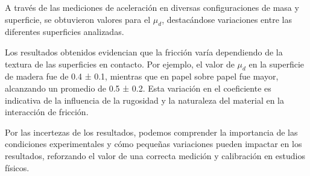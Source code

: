 \documentclass[12pt,a4]{article}
\begin{document}
A través de las mediciones de aceleración en diversas configuraciones de masa y superficie, se obtuvieron valores para el $\mu_d$, destacándose variaciones entre las diferentes superficies analizadas.

Los resultados obtenidos evidencian que la fricción varía dependiendo de la textura de las superficies en contacto. Por ejemplo, el valor de $\mu_d$ en la superficie de madera fue de 0.4 ± 0.1, mientras que en papel sobre papel fue mayor, alcanzando un promedio de 0.5 ± 0.2. Esta variación en el coeficiente es indicativa de la influencia de la rugosidad y la naturaleza del material en la interacción de fricción.

Por las incertezas de los resultados, podemos comprender la importancia de las condiciones experimentales y cómo pequeñas variaciones pueden impactar en los resultados, reforzando el valor de una correcta medición y calibración en estudios físicos.
\end{document}
